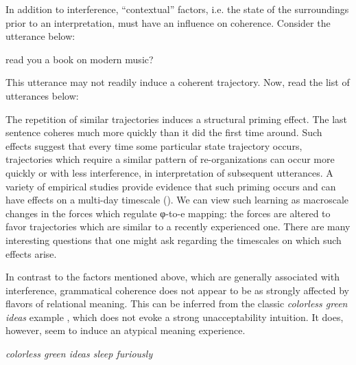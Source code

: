   In addition to interference, “contextual” factors, i.e. the state of the surroundings prior to an interpretation, must have an influence on coherence. Consider the utterance below:

  \ea
    {read you a book on modern music?}
\z

This utterance may not readily induce a coherent trajectory. Now, read the list of utterances below:

\ea
{}
\z
\z

  The repetition of similar trajectories induces a structural priming effect. The last sentence coheres much more quickly than it did the first time around. Such effects suggest that every time some particular state trajectory occurs, trajectories which require a similar pattern of re-organizations can occur more quickly or with less interference, in interpretation of subsequent utterances. A variety of empirical studies provide evidence that such priming occurs and can have effects on a multi-day timescale (\citealt{BockEtAl2007,VSFerreiraEtAl2006,Nagata1988,Nagata1992,PickeringFerreira2008,RowlandEtAl2012}). We can view such learning as macroscale changes in the forces which regulate φ-to-e mapping: the forces are altered to favor trajectories which are similar to a recently experienced one. There are many interesting questions that one might ask regarding the timescales on which such effects arise.

In contrast to the factors mentioned above, which are generally associated with interference, grammatical coherence does not appear to be as strongly affected by flavors of relational meaning. This can be inferred from the classic \textit{colorless green ideas} example \citep{Chomsky1956}, which does not evoke a strong unacceptability intuition. It does, however, seem to induce an atypical meaning experience.

\ea
    \textit{colorless green ideas sleep furiously}
\z

